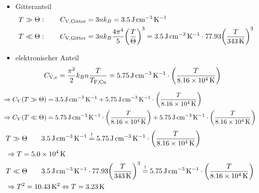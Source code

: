 \documentclass[10pt,a4paper]{exam}
\begin{document}
\begin{enumerate}
        \begin{itemize}
			\item Gitteranteil
            \begin{align*}
				T\gg\Theta : \qquad C_{\mathrm{V,Gitter}} &= 3nk_B = \SI{3.5}{\joule\per\centi\metre\cubed\per\kelvin}\\
                T\ll\Theta:\qquad C_{\mathrm{V,Gitter}} &= 3nk_B\frac{4\pi^4}{5}\qty(\frac{T}{\Theta})^3=\SI{3.5}{\joule\per\centi\metre\cubed\per\kelvin}\cdot\num{77.93}\qty(\frac{T}{\SI{343}{\kelvin}})^3
            \end{align*}
            \item elektronischer Anteil
            \begin{align*}
				C_{\mathrm{V,e}} &= \frac{\pi^2}{2}k_Bn\frac{T}{T_{\mathrm{F,Cu}}}=\SI{5.75}{\joule\per\centi\metre\cubed\per\kelvin}\cdot\qty(\frac{T}{\SI{8.16e4}{\kelvin}})
			\end{align*}
		\end{itemize}
        \begin{align*}
			\Rightarrow C_V(T\gg \Theta) &= \SI{3.5}{\joule\per\centi\metre\cubed\per\kelvin} + \SI{5.75}{\joule\per\centi\metre\cubed\per\kelvin}\cdot\qty(\frac{T}{\SI{8.16e4}{\kelvin}})\\
            \Rightarrow C_V(T\ll\Theta) &= \SI{5.75}{\joule\per\centi\metre\cubed\per\kelvin}\cdot\qty(\frac{T}{\SI{8.16e4}{\kelvin}}) + \SI{5.75}{\joule\per\centi\metre\cubed\per\kelvin}\cdot\qty(\frac{T}{\SI{8.16e4}{\kelvin}})
        \end{align*}
        \begin{align*}
            &T\gg\Theta\qquad \SI{3.5}{\joule\per\centi\metre\cubed\per\kelvin}\stackrel{!}{=}\SI{5.75}{\joule\per\centi\metre\cubed\per\kelvin}\cdot\qty(\frac{T}{\SI{8.16e4}{\kelvin}})\\
            &\Rightarrow T = \SI{5.0e4}{\kelvin}\\
            &T\ll\Theta\qquad \SI{3.5}{\joule\per\centi\metre\cubed\per\kelvin}\cdot\num{77.93}\qty(\frac{T}{\SI{343}{\kelvin}})^3\stackrel{!}{=}\SI{5.75}{\joule\per\centi\metre\cubed\per\kelvin}\cdot\qty(\frac{T}{\SI{8.16e4}{\kelvin}})\\
            & \Rightarrow T^2=\SI{10.43}{\kelvin\squared} \Leftrightarrow T=\SI{3.23}{\kelvin}
		\end{align*}

\end{enumerate}
\end{document}
